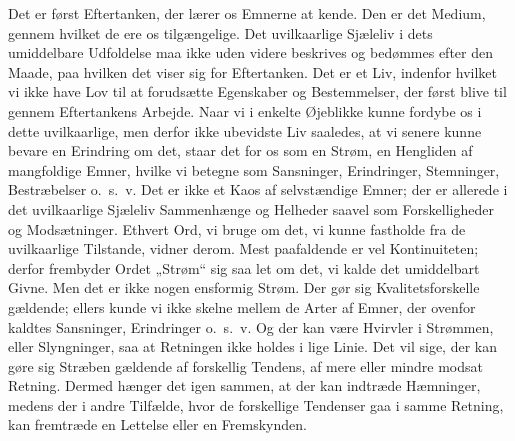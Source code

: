 \documentclass[12pt,a4paper]{book}
\begin{document}
Det er først Eftertanken, der lærer os Emnerne at kende.
Den er det Medium, gennem hvilket de ere os tilgængelige. Det
uvilkaarlige Sjæleliv i dets umiddelbare Udfoldelse maa ikke uden
videre beskrives og bedømmes efter den Maade, paa hvilken det viser
sig for Eftertanken. Det er et Liv, indenfor hvilket vi ikke have Lov
til at forudsætte Egenskaber og Bestemmelser, der først blive til
gennem Eftertankens Arbejde. Naar vi i enkelte Øjeblikke kunne fordybe
os i dette uvilkaarlige, men derfor ikke ubevidste Liv saaledes, at vi
senere kunne bevare en Erindring om det, staar det for os som en
Strøm, en Hengliden af mangfoldige Emner, hvilke vi betegne som
Sansninger, Erindringer, Stemninger, Bestræbelser o.\ s.\ v. Det er
ikke et Kaos af selvstændige Emner; der er allerede i det uvilkaarlige
Sjæleliv Sammenhænge og Helheder saavel som Forskelligheder og
Modsætninger. Ethvert Ord, vi bruge om det, vi kunne fastholde fra de
uvilkaarlige Tilstande, vidner derom. Mest paafaldende er vel
Kontinuiteten; derfor frembyder Ordet „Strøm“ sig saa let om det, vi
kalde det umiddelbart Givne. Men det er ikke nogen ensformig Strøm.
Der gør sig Kvalitetsforskelle gældende; ellers kunde vi ikke skelne
mellem de Arter af Emner, der ovenfor kaldtes Sansninger, Erindringer
o.\ s.\ v. Og der kan være Hvirvler i Strømmen, eller Slyngninger, saa
at Retningen ikke holdes i lige Linie. Det vil sige, der kan gøre sig
Stræben gældende af forskellig Tendens, af mere eller mindre modsat
Retning. Dermed hænger det igen sammen, at der kan indtræde
Hæmninger, medens der i andre Tilfælde, hvor de forskellige Tendenser
gaa i samme Retning, kan fremtræde en Lettelse eller en Fremskynden.
\end{document}
